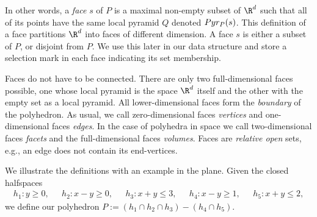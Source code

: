 In other words, a \emph{face} $s$ of $P$ is a maximal non-empty subset
of $\R^d$ such that all of its points have the same local pyramid $Q$
denoted $Pyr_P(s)$.  This definition of a face partitions $\R^d$ into
faces of different dimension. A face $s$ is either a subset of $P$, or
disjoint from $P$.  We use this later in our data structure and store
a selection mark in each face indicating its set membership.

Faces do not have to be connected. There are only two full-dimensional
faces possible, one whose local pyramid is the space $\R^d$ itself and
the other with the empty set as a local pyramid.
All lower-dimensional faces form the \emph{boundary} of
the polyhedron. As usual, we call zero-dimensional faces {\em
vertices} and one-dimensional faces \emph{edges}. In the case of
polyhedra in space we call two-dimensional faces \emph{facets} and
the full-dimensional faces \emph{volumes}. Faces are \emph{relative
open} sets, e.g., an edge does not contain its end-vertices.

    We illustrate the definitions with an example in the plane.
    Given the closed halfspaces
    \[\begin{array}{lllll}
        h_1: y \ge 0,\ \ \    &
        h_2: x - y \ge 0,\ \ \ &
        h_3: x + y \le 3,\ \ \ &
        h_4: x - y \ge 1,\ \ \ &
        h_5: x + y \le 2, 
      \end{array}
    \]
    we define our polyhedron $P := ( h_1 \cap h_2 \cap h_3) - ( h_4 \cap h_5)$.

